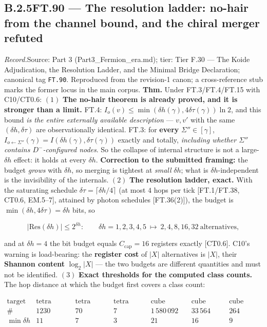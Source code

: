 \documentclass[11pt,openany]{report}
\theoremstyle{canonplain}
\theoremstyle{canondef}
\begin{document}
\medskip
\subsection*{\texorpdfstring{B.2.5\quad FT.90 — The resolution ladder: no-hair from the channel bound, and the chiral merger refuted}{FT.90 B.2.5}}
\label{tag:FT-90}
{\small \textit{Record.}\quad Source: Part 3 (Part3\_Fermion\_era.md); tier: Tier F.30 — The Koide Adjudication, the Resolution Ladder, and the Minimal Bridge Declaration; canonical tag \texttt{FT.90}. Reproduced from the revision-1 canon; a cross-reference stub marks the former locus in the main corpus.}
\medskip
\textbf{Thm.} Under FT.3/FT.4/FT.15 with C10/CT0.6: $(1)$ \textbf{The no-hair theorem is already proved, and it is stronger than a limit.} FT.4: $I_o(v)\le\min(\delta h(\gamma),4\delta\tau(\gamma))\ln2$, and this bound \textit{is the entire externally available description} — $v,v'$ with the same $(\delta h,\delta\tau)$ are observationally identical. FT.3: for \textbf{every} $\Sigma''\in[\gamma]$, $I_{o\leftarrow\Sigma''}(\gamma)=I(\delta h(\gamma),\delta\tau(\gamma))$ exactly and totally, \textit{including whether $\Sigma''$ contains $D^-$-configured nodes}. So the collapse of internal structure is not a large-$\delta h$ effect: it holds at every $\delta h$. \textbf{Correction to the submitted framing:} the budget \textit{grows} with $\delta h$, so merging is tightest at \textit{small} $\delta h$; what is $\delta h$-independent is the invisibility of the internals. $(2)$ \textbf{The resolution ladder, exact.} With the saturating schedule $\delta\tau=\lceil\delta h/4\rceil$ (at most $4$ hops per tick [FT.1/FT.38, CT0.6, EM.5–7], attained by photon schedules [FT.36(2)]), the budget is $\min(\delta h,4\delta\tau)=\delta h$ bits, so

\[
|\mathrm{Res}(\delta h)|\le2^{\delta h}:\qquad\delta h=1,2,3,4,5\ \mapsto\ 2,4,8,16,32\ \text{alternatives},
\]

and at $\delta h=4$ the bit budget equals $C_{\mathrm{cap}}=16$ registers exactly [CT0.6]. C10's warning is load-bearing: the \textbf{register cost} of $|X|$ alternatives is $|X|$, their \textbf{Shannon content} $\log_2|X|$ — the two budgets are different quantities and must not be identified. $(3)$ \textbf{Exact thresholds for the computed class counts.} The hop distance at which the budget first covers a class count:

\[
\begin{array}{c|cccccc}
\text{target} & \text{tetra configs} & \text{tetra classes} & \text{tetra covers} & \text{cube configs} & \text{cube classes} & \text{cube covers}\\
\hline
\# & 1230 & 70 & 7 & 1\,580\,092 & 33\,564 & 264\\
\min\delta h & 11 & 7 & 3 & 21 & 16 & 9
\end{array}
\]
\end{document}
